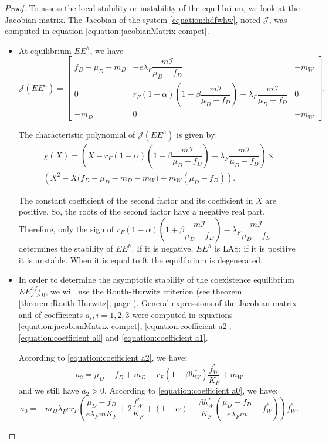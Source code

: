 \documentclass{article}
\newcommand{\lfw}{\lambda_{F}}
\newcommand{\lfw}{\lambda_{F}}
\newcommand{\cI}{\mathcal{I}}
\theoremstyle{definition}
\theoremstyle{remark}
\begin{document}
\begin{proof}
To assess the local stability or instability of the equilibrium, we look at the Jacobian matrix. The Jacobian of the system \eqref{equation:hdfwhw}, noted $\mathcal{J}$, was computed in equation \eqref{equation:jacobianMatrix compet}.

\begin{itemize}
\item At equilibrium $EE^{h}$, we have
\begin{equation*}
\mathcal{J}(EE^{h}) = \begin{bmatrix}
f_D-\mu_D - m_D & -e \lfw \dfrac{m \cI}{\mu_D - f_D} & -m_W \\
0 & r_F(1-\alpha)\left(1-\beta\dfrac{m\cI}{\mu_D - f_D}\right) - \lfw\dfrac{m\cI}{\mu_D - f_D} & 0 \\
-m_D & 0 & -m_W
\end{bmatrix}.
\end{equation*}


The characteristic polynomial of $\mathcal{J}(EE^{h})$ is given by:
\begin{multline*}
\chi(X) = \left(X - r_F(1-\alpha)\left(1+\beta\dfrac{m\cI}{\mu_D - f_D}\right) + \lfw\dfrac{m\cI}{\mu_D - f_D} \right) \times \\ \left(X^2 - X\Big(f_D - \mu_D - m_D - m_W \Big) + m_W(\mu_D - f_D)\right).
\end{multline*}

The constant coefficient of the second factor and its coefficient in $X$ are positive. So, the roots of the second factor have a negative real part. Therefore, only the sign of $r_F(1-\alpha)\left(1+\beta\dfrac{m\cI}{\mu_D - f_D}\right) - \lfw\dfrac{m\cI}{\mu_D - f_D}$ determines the stability of $EE^{h}$. If it is negative, $EE^{h}$ is LAS; if it is positive it is unstable. When it is equal to 0, the equilibrium is degenerated.

\item In order to determine the asymptotic stability of the coexistence equilibrium $EE^{hf_W}_{\cI > 0}$, we will use the Routh-Hurwitz criterion (see theorem \ref{theorem:Routh-Hurwitz}, page \pageref{theorem:Routh-Hurwitz}). General expressions of the Jacobian matrix and of coefficients $a_i, i = 1,2,3$ were computed in equations \eqref{equation:jacobianMatrix compet}, \eqref{equation:coefficient a2}, \eqref{equation:coefficient a0} and \eqref{equation:coefficient a1}. 

According to \eqref{equation:coefficient a2}, we have:
\begin{equation*}
a_2 =  \mu_D - f_D + m_D - r_F (1 - \beta h_W^*) \dfrac{f_W^*}{K_F} + m_W
\end{equation*}
and we still have $a_2>0$. According to \eqref{equation:coefficient a0}, we have:
\begin{equation*}
a_0 = -m_D \lfw e r_F \left(\dfrac{\mu_D -f_D }{e \lfw m K_F} + 2\dfrac{f_W^*}{K_F} + (1-\alpha) - \dfrac{\beta h_W^*}{K_F} \left(\dfrac{\mu_D -f_D }{e \lfw m} + f_W^*\right) \right) f_W^*.
\end{equation*}


\end{itemize}
\end{proof}
\end{document}

